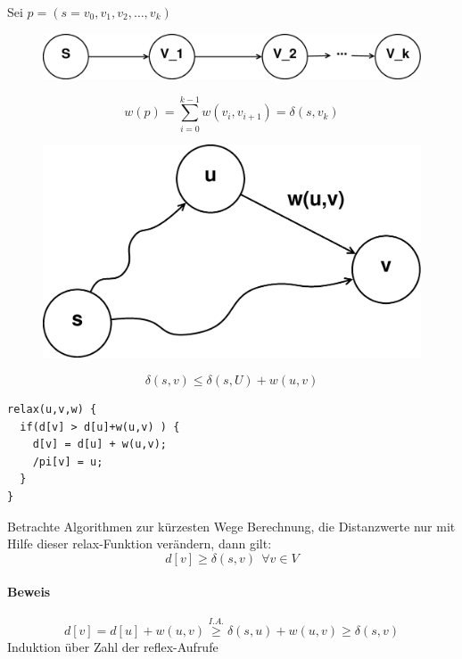 Sei $p=(s=v_0,v_1,v_2,\ldots,v_k)$
\begin{figure}[h]
	\centering
	\includegraphics[width=0.3\linewidth]{16/Grafik/Dijkstra2}
	\caption{}
	\label{fig:Dijkstra2}
	\end{figure}
\[ w(p) = \sum_{i=0}^{k-1}w(v_i,v_{i+1})=\delta(s,v_k) \]
\begin{figure}[h]
	\centering
	\includegraphics[width=0.3\linewidth]{16/Grafik/dijkstra3}
	\caption{}
	\label{fig:Dijkstra3}
	\end{figure}
\[ \delta(s,v)\leq \delta(s,U)+w(u,v) \]
\begin{lstlisting}[style = pseudo]
relax(u,v,w) {
  if(d[v] > d[u]+w(u,v) ) {
    d[v] = d[u] + w(u,v);
    /pi[v] = u;
  }
}
\end{lstlisting}
Betrachte Algorithmen zur kürzesten Wege Berechnung, die Distanzwerte nur mit Hilfe dieser relax-Funktion verändern, dann gilt:
\[ d[v] \geq \delta(s,v)~~\forall v\in V \]
\paragraph{Beweis}
\[ d[v] = d[u]+w(u,v) \overset{I.A.}{\geq} \delta(s,u)+w(u,v) \geq \delta(s,v) \]
Induktion über Zahl der reflex-Aufrufe